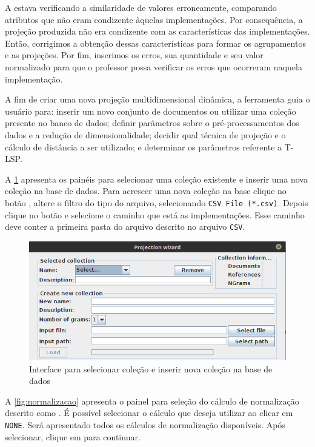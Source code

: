 		A  estava verificando a similaridade de valores erroneamente,
		comparando atributos que não eram condizente àquelas implementações. Por consequência,
		a projeção produzida não era condizente com as características das implementações.
		Então, corrigimos a obtenção dessas características para formar os agrupamentos e
		as projeções. Por fim, inserimos os erros, sua quantidade e seu valor normalizado
		para que o professor possa verificar os erros que ocorreram naquela implementação.
		
		A fim de criar uma nova projeção multidimensional dinâmica, a ferramenta guia o usuário
		para: inserir um novo conjunto de documentos ou utilizar uma coleção presente no banco
		de dados; definir parâmetros sobre o pré-processamentos dos dados e a redução de
		dimensionalidade; decidir qual técnica de projeção e o cálculo de distância a ser utilizado;
		e determinar os parâmetros referente a \acs{T-LSP}.

		A \cref{fig:createDatabase} apresenta os painéis para selecionar uma coleção existente
		e inserir uma nova coleção na base de dados. Para acrescer uma nova coleção na base
		clique no botão , altere o filtro do tipo do arquivo, selecionando
		\texttt{CSV File (*.csv)}. Depois clique no botão  e selecione o
		caminho que está as implementações. Esse caminho deve conter a primeira pasta do
		arquivo descrito no arquivo \texttt{CSV}.
		
		\begin{figure}
			\centering
			\includegraphics[width=0.8\linewidth]{imagem/createDatabase}
			\caption{Interface para selecionar coleção e inserir nova coleção na base de dados}
			\label{fig:createDatabase}
		\end{figure}
		
		A \cref{fig:normalizacao} apresenta o painel para seleção do cálculo de normalização
		descrito como . É possível selecionar o cálculo que deseja
		utilizar ao clicar em \texttt{NONE}. Será apresentado todos os cálculos de
		normalização disponíveis. Após selecionar, clique em  para continuar.
		
